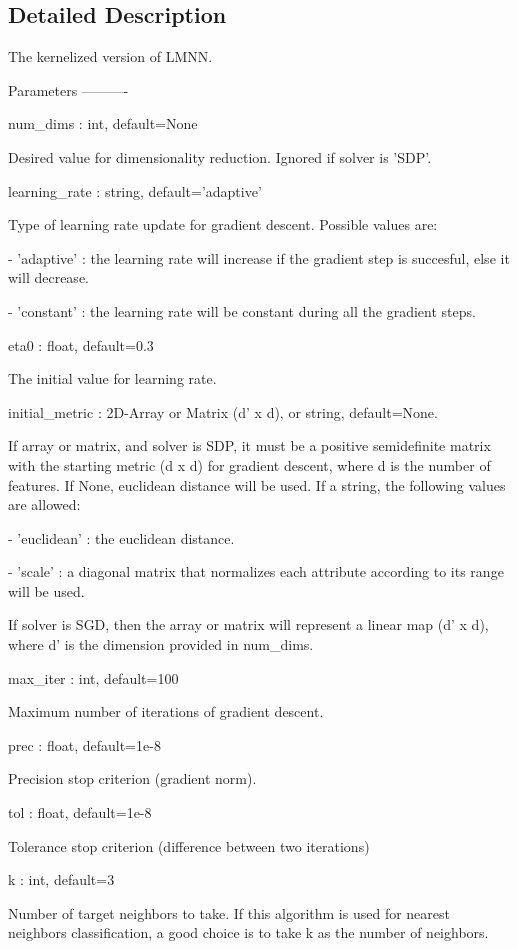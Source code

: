 \subsection{Detailed Description}
\begin{DoxyVerb}The kernelized version of LMNN.

Parameters
----------

num_dims : int, default=None

    Desired value for dimensionality reduction. Ignored if solver is 'SDP'.

learning_rate : string, default='adaptive'

    Type of learning rate update for gradient descent. Possible values are:

    - 'adaptive' : the learning rate will increase if the gradient step is succesful, else it will decrease.

    - 'constant' : the learning rate will be constant during all the gradient steps.

eta0 : float, default=0.3

    The initial value for learning rate.

initial_metric : 2D-Array or Matrix (d' x d), or string, default=None.

    If array or matrix, and solver is SDP, it must be a positive semidefinite matrix with the starting metric (d x d) for gradient descent, where d is the number of features.
    If None, euclidean distance will be used. If a string, the following values are allowed:

    - 'euclidean' : the euclidean distance.

    - 'scale' : a diagonal matrix that normalizes each attribute according to its range will be used.

    If solver is SGD, then the array or matrix will represent a linear map (d' x d), where d' is the dimension provided in num_dims.

max_iter : int, default=100

    Maximum number of iterations of gradient descent.

prec : float, default=1e-8

    Precision stop criterion (gradient norm).

tol : float, default=1e-8

    Tolerance stop criterion (difference between two iterations)

k : int, default=3

    Number of target neighbors to take. If this algorithm is used for nearest neighbors classification, a good choice is
    to take k as the number of neighbors.


\end{DoxyVerb}
